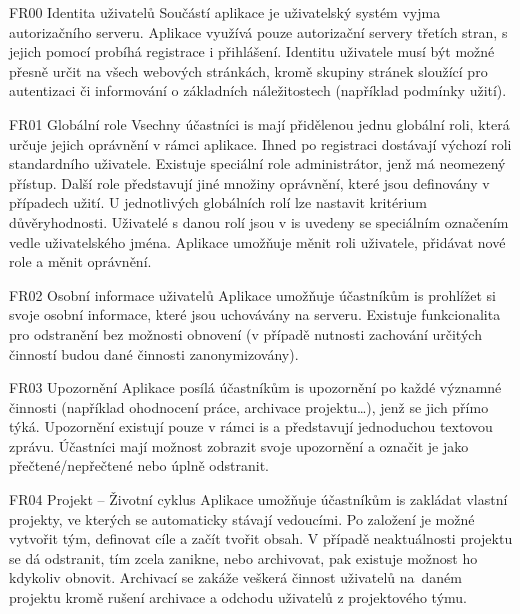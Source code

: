 \begin{dl}
   \item[FR00 Identita uživatelů]
   Součástí aplikace je uživatelský systém vyjma autorizačního serveru. Aplikace využívá pouze autorizační servery třetích stran, s jejich pomocí probíhá registrace i přihlášení. Identitu uživatele musí být možné přesně určit na všech webových stránkách, kromě skupiny stránek sloužící pro autentizaci či informování o základních náležitostech (například podmínky užití).

   \item[FR01 Globální role]
   Vsechny účastníci \gls{is} mají přidělenou jednu globální roli, která určuje jejich oprávnění v rámci aplikace. Ihned po registraci dostávají výchozí roli standardního uživatele. Existuje speciální role administrátor, jenž má neomezený přístup. Další role představují jiné množiny oprávnění, které jsou definovány v případech užití. U jednotlivých globálních rolí lze nastavit kritérium důvěryhodnosti. Uživatelé s danou rolí jsou v \gls{is} uvedeny se speciálním označením vedle uživatelského jména. Aplikace umožňuje měnit roli uživatele, přidávat nové role a měnit oprávnění.

   \item[FR02 Osobní informace uživatelů]
   Aplikace umožňuje účastníkům \gls{is} prohlížet si svoje osobní informace, které jsou uchovávány na serveru. Existuje funkcionalita pro odstranění bez možnosti obnovení (v případě nutnosti zachování určitých činností budou dané činnosti zanonymizovány).

   \item[FR03 Upozornění]
   Aplikace posílá účastníkům \gls{is} upozornění po každé významné činnosti (například ohodnocení práce, archivace projektu\dots{}), jenž se jich přímo týká. Upozornění existují pouze v rámci \gls{is} a představují jednoduchou textovou zprávu. Účastníci mají možnost zobrazit svoje upozornění a označit je jako přečtené/nepřečtené nebo úplně odstranit.

   \item[FR04 Projekt -- Životní cyklus]
   Aplikace umožňuje účastníkům \gls{is} zakládat vlastní projekty, ve kterých se automaticky stávají vedoucími. Po založení je možné vytvořit tým, definovat cíle a začít tvořit obsah. V případě neaktuálnosti projektu se dá odstranit, tím zcela zanikne, nebo archivovat, pak existuje možnost ho kdykoliv obnovit. Archivací se zakáže veškerá činnost uživatelů na~daném projektu kromě rušení archivace a odchodu uživatelů z projektového týmu.


\end{dl}
